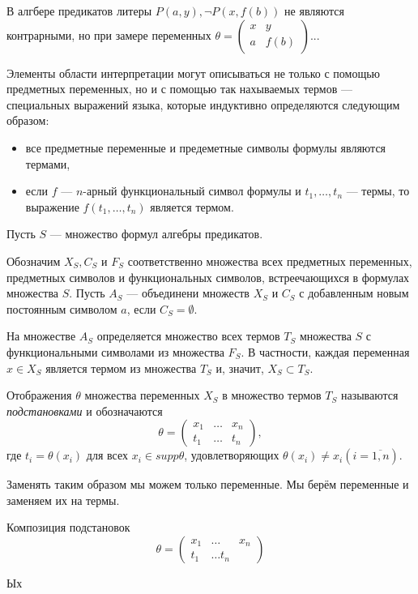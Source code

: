 В алгбере предикатов литеры $P(a, y), \neg P(x,f(b))$ не являются контрарными, но при замере переменных $\theta = \left(\begin{matrix}x & y \\ a & f(b)\end{matrix}\right)$...

Элементы области интерпретации могут описываться не только с помощью предметных переменных, но и с помощью так нахываемых термов --- специальных выражений языка, которые индуктивно определяются следующим образом:
\begin{itemize}
    \item все предметные переменные и предеметные символы формулы являются термами,
    \item если $f$ --- $n$-арный функциональный символ формулы и $t_1,\dots,t_n$ --- термы, то выражение $f(t_1,\dots,t_n)$ является термом.
\end{itemize}

Пусть $S$ --- множество формул алгебры предикатов.

Обозначим $X_S, C_S$ и $F_S$ соответственно множества всех предметных переменных, предметных символов и функциональных символов, встреечающихся в формулах множества $S$. Пусть $A_S$ --- объединени множеств $X_S$ и $C_S$ с добавленным новым постоянным символом $a$, если $C_S = \emptyset$.

На множестве $A_S$ определяется множество всех термов $T_S$ множества $S$ с функциональными символами из множества $F_S$. В частности, каждая переменная $x \in X_S$ является термом из множества $T_S$ и, значит, $X_S \subset T_S$.

Отображения $\theta$ множества переменных $X_S$ в множество термов $T_S$ называются {\it подстановками} и обозначаются
\begin{equation*}
    \theta = \left(\begin{matrix}
        x_1 & \dots & x_n \\ t_1 & \dots & t_n
    \end{matrix}\right),
\end{equation*}
где $t_i = \theta(x_i)$ для всех $x_i \in supp \theta$, удовлетворяющих $\theta(x_i) \neq x_i (i = \overline{1,n})$.

Заменять таким образом мы можем только переменные. Мы берём переменные и заменяем их на термы.

Композиция подстановок
\begin{equation*}
    \theta = \left(\begin{matrix}
        x_1 & \dots & x_n \\ t_1 & \dots t_n
    \end{matrix}\right)
\end{equation*}

Ых